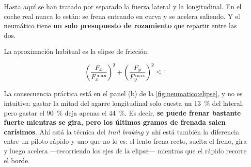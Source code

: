 Hasta aquí se han tratado por separado la fuerza lateral y la longitudinal. En
el coche real nunca lo están: se frena entrando en curva y se acelera saliendo.
Y el neumático tiene \textbf{un solo presupuesto de rozamiento} que repartir
entre las dos.

La aproximación habitual es la elipse de fricción:

\begin{equation}
  \left(\frac{F_x}{F_x^{\max}}\right)^{2} +
  \left(\frac{F_y}{F_y^{\max}}\right)^{2} \le 1
  \label{eq:elipse}
\end{equation}

La consecuencia práctica está en el panel (b) de la
\cref{fig:neumatico:elipse}, y no es intuitiva: gastar la mitad del agarre
longitudinal solo cuesta un \SI{13}{\percent} del lateral, pero gastar el
\SI{90}{\percent} deja apenas el \SI{44}{\percent}. Es decir, \textbf{se puede
frenar bastante fuerte mientras se gira, pero los últimos gramos de frenada
salen carísimos}. Ahí está la técnica del \emph{trail braking} y ahí está
también la diferencia entre un piloto rápido y uno que no lo es: el lento frena
recto, suelta el freno, gira y luego acelera ---recorriendo los ejes de la
elipse--- mientras que el rápido recorre el borde.

